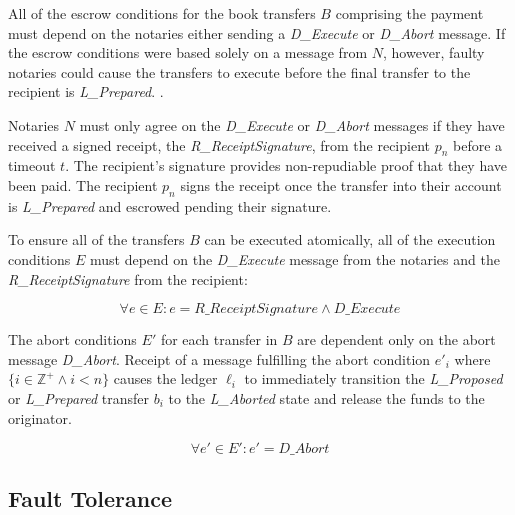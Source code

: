 \documentclass[letterpaper,twocolumn,10pt]{article}
\begin{document}
All of the escrow conditions for the book transfers $B$ comprising the payment must depend on the notaries either sending a \textit{D\_Execute} or \textit{D\_Abort} message. If the escrow conditions were based solely on a message from $N$, however, faulty notaries could cause the transfers to execute before the final transfer to the recipient is \textit{L\_Prepared}. \cite{dolev1983authenticated}.

Notaries $N$ must only agree on the \textit{D\_Execute} or \textit{D\_Abort} messages if they have received a signed receipt, the \textit{R\_ReceiptSignature}, from the recipient $p_n$ before a timeout $t$. The recipient's signature provides non-repudiable proof that they have been paid. The recipient $p_n$ signs the receipt once the transfer into their account is \textit{L\_Prepared} and escrowed pending their signature.


To ensure all of the transfers $B$ can be executed atomically, all of the execution conditions $E$ must depend on the \textit{D\_Execute} message from the notaries and the \textit{R\_ReceiptSignature} from the recipient:


\begin{equation}
\forall e \in E : e = \textit{R\_ReceiptSignature} \land \textit{D\_Execute}
\end{equation}

The abort conditions $E'$ for each transfer in $B$ are dependent only on the abort message \textit{D\_Abort}. Receipt of a message fulfilling the abort condition $e'_i$ where $\{ i \in \mathbb{Z}^+ \land i < n \}$ causes the ledger $\ell_i$ to immediately transition the \textit{L\_Proposed} or \textit{L\_Prepared} transfer $b_i$ to the \textit{L\_Aborted} state and release the funds to the originator.

\begin{equation}
\forall e' \in E' : e' = \textit{D\_Abort}
\end{equation}

\subsection{Fault Tolerance}
\label{subsec:fault-tolerance}
\end{document}
